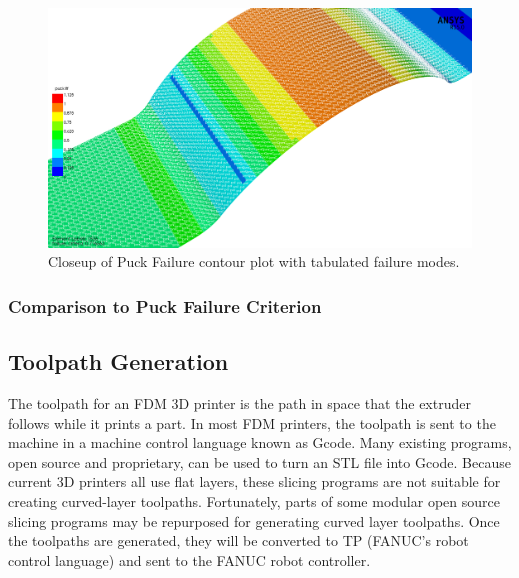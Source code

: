 \begin{figure}[htp]
\centering
\includegraphics[width=1\textwidth]{./figures/fea/fea-acp-pfailure-mode-closeup}
\caption{Closeup of Puck Failure contour plot with tabulated failure modes.}
\label{fig:fea-acp-pfailure-mode-closeup}
\end{figure}

\clearpage

\subsubsection{Comparison to Puck Failure Criterion}

\clearpage

\subsection{Toolpath Generation}

\indent

The toolpath for an FDM 3D printer is the path in space that the extruder follows while it prints a part. In most FDM printers, the toolpath is sent to the machine in a machine control language known as Gcode. Many existing programs, open source and proprietary, can be used to turn an STL file into Gcode. Because current 3D printers all use flat layers, these slicing programs are not suitable for creating curved-layer toolpaths. Fortunately, parts of some modular open source slicing programs may be repurposed for generating curved layer toolpaths. Once the toolpaths are generated, they will be converted to TP (FANUC's robot control language) and sent to the FANUC robot controller. \\
